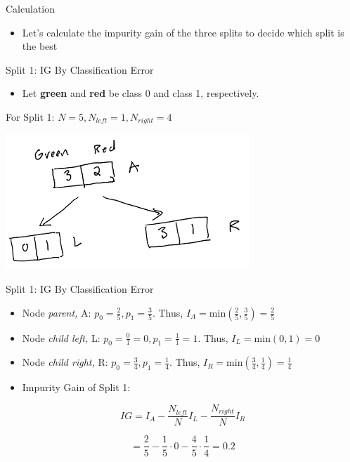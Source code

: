 \documentclass[
  ignorenonframetext,
]{beamer}
\providecommand{\tightlist}{%
  \setlength{\itemsep}{0pt}\setlength{\parskip}{0pt}}
\begin{document}
\begin{frame}{Calculation}
\protect\hypertarget{calculation}{}

\begin{itemize}
\tightlist
\item
  Let's calculate the impurity gain of the three splits to decide which
  split is the best
\end{itemize}

\end{frame}

\begin{frame}{Split 1: IG By Classification Error}
\protect\hypertarget{split-1-ig-by-classification-error}{}

\begin{itemize}
\tightlist
\item
  Let \textbf{green} and \textbf{red} be class 0 and class 1,
  respectively.
\end{itemize}

For Split 1: \(N = 5, N_{left} =1, N_{right} = 4\)

\includegraphics{images2/im1.png}

\end{frame}

\begin{frame}{Split 1: IG By Classification Error}
\protect\hypertarget{split-1-ig-by-classification-error-1}{}

\begin{itemize}
\item
  Node \emph{parent,} A: \(p_0 = \frac{2}{5}, p_1 = \frac{3}{5}\). Thus,
  \(I_{A} = \text{min}(\frac{2}{5}, \frac{3}{5}) = \frac{2}{5}\)
\item
  Node \emph{child left,} L:
  \(p_0 = \frac{0}{1} = 0, p_1 = \frac{1}{1} = 1\). Thus,
  \(I_{L} = \text{min}(0, 1) = 0\)
\item
  Node \emph{child right,} R: \(p_0 = \frac{3}{4}, p_1 = \frac{1}{4}\).
  Thus, \(I_{R} = \text{min}(\frac{3}{4}, \frac{1}{4}) = \frac{1}{4}\)
\item
  Impurity Gain of Split 1:
\end{itemize}

\[
IG = I_{A} - \frac{N_{left}}{N}I_{L}-\frac{N_{right}}{N}I_{R}
\]

\[     = \frac{2}{5} - \frac{1}{5} \cdot 0-\frac{4}{5} \cdot \frac{1}{4} = 0.2\]

\end{frame}
\end{document}
